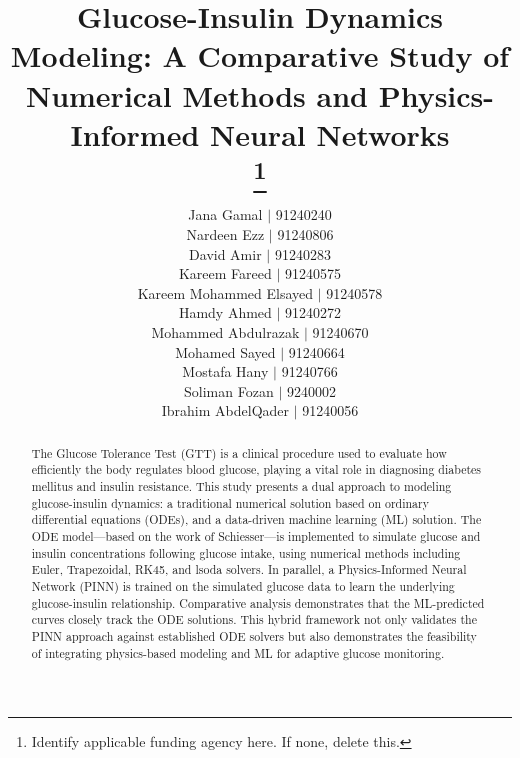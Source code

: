 \documentclass[conference]{IEEEtran}
\begin{document}
\title{Glucose-Insulin Dynamics Modeling: A Comparative Study of Numerical Methods and Physics-Informed Neural Networks\\

\thanks{Identify applicable funding agency here. If none, delete this.}
}

\author{
  \begin{minipage}{0.9\textwidth}
    \centering
    Jana Gamal $|$ 91240240\\
    Nardeen Ezz $|$ 91240806\\
    David Amir $|$ 91240283\\
    Kareem Fareed $|$ 91240575\\
    Kareem Mohammed Elsayed $|$ 91240578\\
    Hamdy Ahmed $|$ 91240272\\
    Mohammed Abdulrazak $|$ 91240670\\
    Mohamed Sayed $|$ 91240664\\
    Mostafa Hany $|$ 91240766\\
    Soliman Fozan $|$ 9240002\\
    Ibrahim AbdelQader $|$ 91240056
  \end{minipage}
}

\maketitle 

\begin{abstract}
The Glucose Tolerance Test (GTT) is a clinical procedure used to evaluate how efficiently the body regulates blood glucose, playing a vital role in diagnosing diabetes mellitus and insulin resistance. This study presents a dual approach to modeling glucose-insulin dynamics: a traditional numerical solution based on ordinary differential equations (ODEs), and a data-driven machine learning (ML) solution. The ODE model—based on the work of Schiesser—is implemented to simulate glucose and insulin concentrations following glucose intake, using numerical methods including Euler, Trapezoidal, RK45, and lsoda solvers. In parallel, a Physics-Informed Neural Network (PINN) is trained on the simulated glucose data to learn the underlying glucose-insulin relationship. Comparative analysis demonstrates that the ML-predicted curves closely track the ODE solutions. This hybrid framework not only validates the PINN approach against established ODE solvers but also demonstrates the feasibility of integrating physics-based modeling and ML for adaptive glucose monitoring.
\end{abstract}
\end{document}
